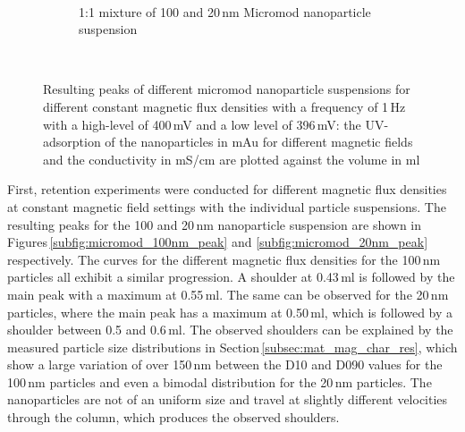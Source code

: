 \begin{figure}
\begin{subfigure}{0.49\textwidth}
        \end{subfigure}
        \\
        	\centering
            \begin{subfigure}{0.49\textwidth}
                  \flushleft
                  \caption{1:1 mixture of 100 and 20\,nm Micromod nanoparticle suspension}\label{subfig:micromod_mix_peak}
          \end{subfigure}\hfill
          \\
        \caption[Resulting peaks of different micromod nanoparticle suspensions for different constant magnetic flux densities]{Resulting peaks of different micromod nanoparticle suspensions for different constant magnetic flux densities with a frequency of 1\,Hz with a high-level of 400\,mV and a low level of 396\,mV: the UV-adsorption of the nanoparticles in mAu for different magnetic fields and the conductivity in mS/cm are plotted against the volume in ml}
        \label{fig:micromod_peaks}
  \end{figure}
\FloatBarrier
First, retention experiments were conducted for different magnetic flux densities at constant magnetic field settings with the individual particle suspensions. The resulting peaks for the 100 and 20\,nm nanoparticle suspension are shown in Figures\,\ref{subfig:micromod_100nm_peak} and \ref{subfig:micromod_20nm_peak} respectively. The curves for the different magnetic flux densities for the 100\,nm particles all exhibit a similar progression. A shoulder at 0.43\,ml is followed by the main peak with a maximum at 0.55\,ml. The same can be observed for the 20\,nm particles, where the main peak has a maximum at 0.50\,ml, which is followed by a shoulder between 0.5 and 0.6\,ml. The observed shoulders can be explained by the measured particle size distributions in Section\,\ref{subsec:mat_mag_char_res}, which show a large variation of over 150\,nm between the D10 and D090 values for the 100\,nm particles and even a bimodal distribution for the 20\,nm particles. The nanoparticles are not of an uniform size and travel at slightly different velocities through the column, which produces the observed shoulders. 
